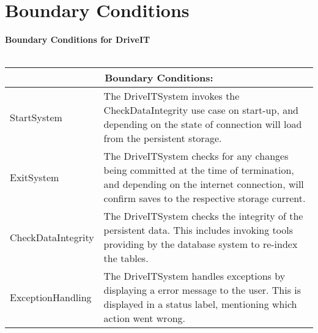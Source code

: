 \section{Boundary Conditions}

\textbf{Boundary Conditions for DriveIT}\\\\
\begin{tabular}{ | p{4cm} | p{10cm} | }
  \hline
  \multicolumn{2}{|c|}{Boundary Conditions:} \\
  \hline
    StartSystem & The DriveITSystem invokes the CheckDataIntegrity use case on start-up, and depending on the state of connection  will load from the persistent storage.\\
    \hline
    ExitSystem & The DriveITSystem checks for any changes being committed at the time of termination, and depending on the internet connection, will confirm saves to the respective storage current. \\
    \hline
    CheckDataIntegrity & The DriveITSystem checks the integrity of the persistent data. This includes invoking tools providing by the database system to re-index the tables. \\
    \hline
    ExceptionHandling & The DriveITSystem handles exceptions by displaying a error message to the user. This is displayed in a status label, mentioning which action went wrong. 
\end{tabular}
